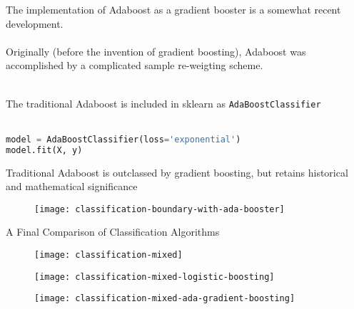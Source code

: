 %
\begin{frame}[fragile]
The implementation of Adaboost as a gradient booster is a somewhat recent development.\\~\\

Originally (before the invention of gradient boosting), Adaboost was accomplished by a complicated sample re-weigting scheme.\\~\\
\end{frame}
%
\begin{frame}[fragile]
The traditional Adaboost is included in sklearn as \texttt{AdaBoostClassifier}\\~\\

\begin{lstlisting}[language=python]
model = AdaBoostClassifier(loss='exponential')
model.fit(X, y)
\end{lstlisting}
\end{frame}
%
\begin{frame}[fragile]
Traditional Adaboost is outclassed by gradient boosting, but retains historical and mathematical significance

  \begin{figure}
    \texttt{[image: classification-boundary-with-ada-booster]}
  \end{figure}
 
\end{frame}
%
\begin{frame}{A Final Comparison of Classification Algorithms}

  \begin{figure}
    \texttt{[image: classification-mixed]}
  \end{figure}

\end{frame}
%
\begin{frame}

  \begin{figure}
    \texttt{[image: classification-mixed-logistic-boosting]}
  \end{figure}
  
\end{frame}
%
\begin{frame}

  \begin{figure}
    \texttt{[image: classification-mixed-ada-gradient-boosting]}
  \end{figure}
  
\end{frame}
